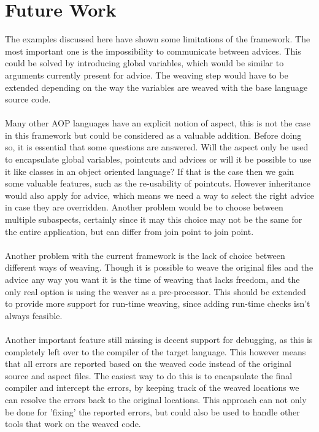 \documentclass[a4paper]{report}
\begin{document}
\chapter{Future Work}
\label{chap:FutureWork}
The examples discussed here have shown some limitations of the framework. The most important one is the impossibility to communicate between advices. This could be solved by introducing global variables, which would be similar to arguments currently present for advice. The weaving step would have to be extended depending on the way the variables are weaved with the base language source code.\\
\\
Many other AOP languages have an explicit notion of aspect, this is not the case in this framework but could be considered as a valuable addition. Before doing so, it is essential that some questions are answered. Will the aspect only be used to encapsulate global variables, pointcuts and advices or will it be possible to use it like classes in an object oriented language? If that is the case then we gain some valuable features, such as the re-usability of pointcuts. However inheritance would also apply for advice, which means we need a way to select the right advice in case they are overridden. Another problem would be to choose between multiple subaspects, certainly since it may this choice may not be the same for the entire application, but can differ from join point to join point.\\
\\
Another problem with the current framework is the lack of choice between different ways of weaving. Though it is possible to weave the original files and the advice any way you want it is the time of weaving that lacks freedom, and the only real option is using the weaver as a pre-processor. This should be extended to provide more support for run-time weaving, since adding run-time checks isn't always feasible.\\
\\
Another important feature still missing is decent support for debugging, as this is completely left over to the compiler of the target language. This however means that all errors are reported based on the weaved code instead of the original source and aspect files. The easiest way to do this is to encapsulate the final compiler and intercept the errors, by keeping track of the weaved locations we can resolve the errors back to the original locations. This approach can not only be done for 'fixing' the reported errors, but could also be used to handle other tools that work on the weaved code.\\
\end{document}
